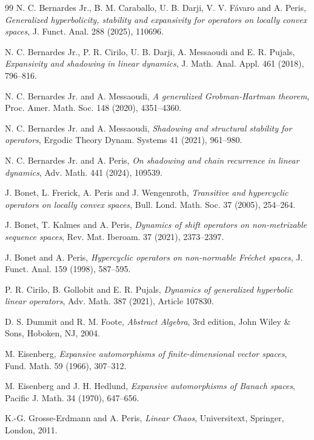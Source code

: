 \documentclass[11pt]{amsart}
\theoremstyle{definition}
\theoremstyle{remark}
\theoremstyle{plain}
\begin{document}
\begin{thebibliography}{99}
N. C. Bernardes Jr., B. M. Caraballo, U. B. Darji, V. V. F\'avaro and A. Peris,
\emph{Generalized hyperbolicity, stability and expansivity for operators on
locally convex spaces}, J. Funct. Anal. 288 (2025), 110696.

N. C. Bernardes Jr., P. R. Cirilo, U. B. Darji, A. Messaoudi and E. R. Pujals,
\emph{Expansivity and shadowing in linear dynamics},
J. Math. Anal. Appl. 461 (2018), 796--816.

N. C. Bernardes Jr. and A. Messaoudi,
\emph{A generalized Grobman-Hartman theorem},
Proc. Amer. Math. Soc. 148 (2020), 4351--4360.

N. C. Bernardes Jr. and A. Messaoudi,
\emph{Shadowing and structural stability for operators},
Ergodic Theory Dynam. Systems 41 (2021), 961--980.

N. C. Bernardes Jr. and A. Peris,
\emph{On shadowing and chain recurrence in linear dynamics},
Adv. Math. 441 (2024), 109539.

J. Bonet, L. Frerick, A. Peris and J. Wengenroth,
\emph{Transitive and hypercyclic operators on locally convex spaces},
Bull. Lond. Math. Soc. 37 (2005), 254--264.

J. Bonet, T. Kalmes and A. Peris,
\emph{Dynamics of shift operators on non-metrizable sequence spaces},
Rev. Mat. Iberoam. 37 (2021), 2373--2397.

J. Bonet and A. Peris,
\emph{Hypercyclic operators on non-normable Fr\'echet spaces},
J. Funct. Anal. 159 (1998), 587--595.

P. R. Cirilo, B. Gollobit and E. R. Pujals,
\emph{Dynamics of generalized hyperbolic linear operators},
Adv. Math. 387 (2021), Article 107830.

D. S. Dummit and R. M. Foote,
\emph{Abstract Algebra},
3rd edition,
John Wiley \& Sons, Hoboken, NJ, 2004.

M. Eisenberg,
\emph{Expansive automorphisms of finite-dimensional vector spaces},
Fund. Math. 59 (1966), 307--312.

M. Eisenberg and J. H. Hedlund,
\emph{Expansive automorphisms of Banach spaces},
Pacific J. Math. 34 (1970), 647--656.

K.-G. Grosse-Erdmann and A. Peris,
\emph{Linear Chaos},
Universitext, Springer, London, 2011.


\end{thebibliography}
\end{document}
